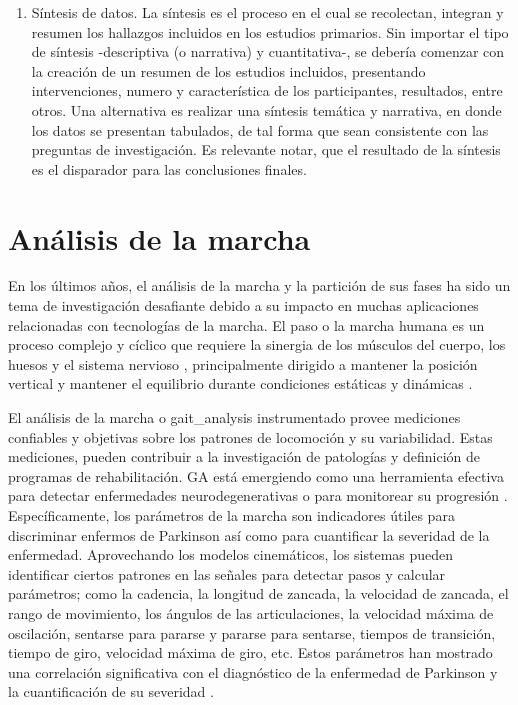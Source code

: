 \begin{enumerate}[label=(\roman*)]
  \item Síntesis de datos. La síntesis es el proceso en el cual se recolectan, integran y resumen los hallazgos incluidos en los estudios primarios. Sin importar el tipo de síntesis -descriptiva (o narrativa) y cuantitativa-, se debería comenzar con la creación de un resumen de los estudios incluidos, presentando intervenciones, numero y característica de los participantes, resultados, entre otros. Una alternativa es realizar una síntesis temática y narrativa, en donde los datos se presentan tabulados, de tal forma que sean consistente con las preguntas de investigación. Es relevante notar, que el resultado de la síntesis es el disparador para las conclusiones finales.
\end{enumerate}

\section{Análisis de la marcha}

En los últimos años, el análisis de la marcha y la partición de sus fases ha sido un tema de investigación desafiante debido a su impacto en muchas aplicaciones relacionadas con tecnologías de la marcha. El paso o la marcha humana es un proceso complejo y cíclico que requiere la sinergia de los músculos del cuerpo, los huesos y el sistema nervioso \cite{SAUNDERS1953}, principalmente dirigido a mantener la posición vertical y mantener el equilibrio durante condiciones estáticas y dinámicas \cite{Ayyappa1997}. 

El análisis de la marcha o \gls{gait_analysis} instrumentado provee mediciones confiables y objetivas sobre los patrones de locomoción y su variabilidad. Estas mediciones, pueden contribuir a la investigación de patologías y definición de programas de rehabilitación. GA está emergiendo como una herramienta efectiva para detectar enfermedades neurodegenerativas o para monitorear su progresión \cite{Bertoli2018}. Específicamente, los parámetros de la marcha son indicadores útiles para discriminar enfermos de Parkinson así como para cuantificar la severidad de la enfermedad. Aprovechando los modelos cinemáticos, los sistemas pueden identificar ciertos patrones en las señales para detectar pasos y calcular parámetros; como la cadencia, la longitud de zancada, la velocidad de zancada, el rango de movimiento, los ángulos de las articulaciones, la velocidad máxima de oscilación, sentarse para pararse y pararse para sentarse, tiempos de transición, tiempo de giro, velocidad máxima de giro, etc. Estos parámetros han mostrado una correlación significativa con el diagnóstico de la enfermedad de Parkinson y la cuantificación de su severidad \cite{Akbari2017}.

